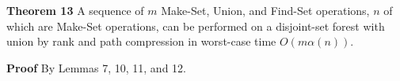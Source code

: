 \documentclass{beamer}
\begin{document}
\begin{frame}{}

{\bf Theorem 13} A sequence of $m$ {\sc Make-Set}, {\sc Union}, and {\sc Find-Set} operations, $n$
of which are {\sc Make-Set} operations, can be performed on a disjoint-set forest with union by rank
 and path compression in worst-case time $O(m\alpha(n))$. 

{\bf Proof} By Lemmas 7, 10, 11, and 12. 
\end{frame}
\end{document}
